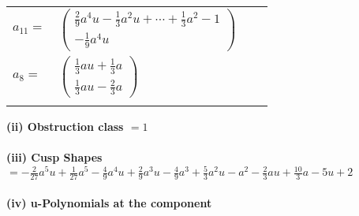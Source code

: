 \documentclass[1p]{elsarticle_modified}
\theoremstyle{definition}
\begin{document}
\begin{tabular}{m{7pt} m{180pt} m{7pt} m{180pt} }
\flushright $a_{11}=$&$\begin{pmatrix}\frac{2}{9} a^4 u-\frac{1}{3} a^2 u+\cdots+\frac{1}{3} a^2-1\\-\frac{1}{9} a^4 u\end{pmatrix}$ \\
\flushright $a_{8}=$&$\begin{pmatrix}\frac{1}{3} a u+\frac{1}{3} a\\\frac{1}{3} a u-\frac{2}{3} a\end{pmatrix}$\\&\end{tabular}
\flushleft \textbf{(ii) Obstruction class $= 1$}\\~\\
\flushleft \textbf{(iii) Cusp Shapes $= -\frac{2}{27} a^5 u+\frac{1}{27} a^5-\frac{4}{9} a^4 u+\frac{2}{9} a^3 u-\frac{4}{9} a^3+\frac{5}{3} a^2 u- a^2-\frac{2}{3} a u+\frac{10}{3} a-5 u+2$}\\~\\
\newpage\renewcommand{\arraystretch}{1}
\flushleft \textbf{(iv) u-Polynomials at the component}\newline \\
\end{document}
